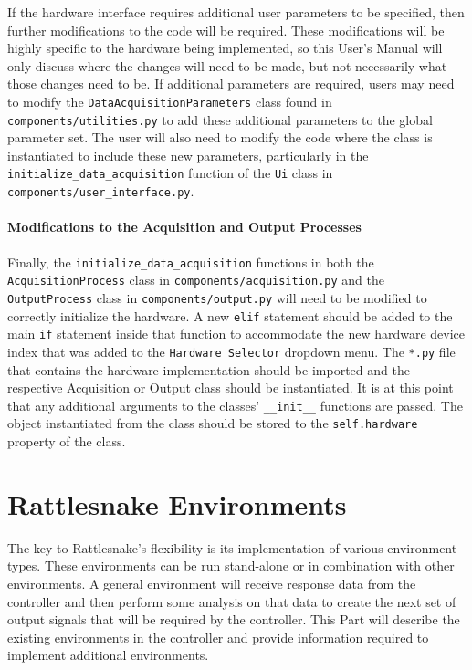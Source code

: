 \documentclass[pdf,12pt,report]{SANDreport}
\newcommand{\inlineCode}{\lstinline[basicstyle=\bfseries\ttfamily]}
\begin{document}
    If the hardware interface requires additional user parameters to be specified, then further modifications to the code will be required.  These modifications will be highly specific to the hardware being implemented, so this User's Manual will only discuss where the changes will need to be made, but not necessarily what those changes need to be.  If additional parameters are required, users may need to modify the \inlineCode{DataAcquisitionParameters} class found in \inlineCode{components/utilities.py} to add these additional parameters to the global parameter set.  The user will also need to modify the code where the class is instantiated to include these new parameters, particularly in the \inlineCode{initialize_data_acquisition} function of the \inlineCode{Ui} class in \inlineCode{components/user_interface.py}.
    
    \subsection{Modifications to the Acquisition and Output Processes}
    Finally, the \inlineCode{initialize_data_acquisition} functions in both the \inlineCode{AcquisitionProcess} class in \inlineCode{components/acquisition.py} and the \inlineCode{OutputProcess} class in \inlineCode{components/output.py} will need to be modified to correctly initialize the hardware.  A new \inlineCode{elif} statement should be added to the main \inlineCode{if} statement inside that function to accommodate the new hardware device index that was added to the \inlineCode{Hardware Selector} dropdown menu.  The \inlineCode{*.py} file that contains the hardware implementation should be imported and the respective Acquisition or Output class should be instantiated.  It is at this point that any additional arguments to the classes' \inlineCode{__init__} functions are passed.  The object instantiated from the class should be stored to the \inlineCode{self.hardware} property of the class.

    \part{Rattlesnake Environments}\label{sec:rattlesnake_environments}
    
    The key to Rattlesnake's flexibility is its implementation of various environment types.  These environments can be run stand-alone or in combination with other environments.  A general environment will receive response data from the controller and then perform some analysis on that data to create the next set of output signals that will be required by the controller.  This Part will describe the existing environments in the controller and provide information required to implement additional environments.
    
\end{document}
